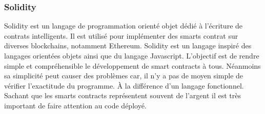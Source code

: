 \subsubsection{Solidity}

Solidity est un langage de programmation orienté objet dédié à l'écriture de contrats intelligents. Il est utilisé pour implémenter des smarts contrat sur diverses 
blockchains, notamment Ethereum. Solidity est un langage inspiré des langages orientées objets ainsi que du langage Javascript. L'objectif est de rendre simple et
compréhensible le développement de smart contracts à tous. Néanmoins sa simplicité peut causer des problèmes car, il n'y a pas de moyen simple de vérifier 
l'exactitude du programme. À la différence d'un langage fonctionnel. Sachant que les smarts contracts représentent souvent de l'argent il est très important
de faire attention au code déployé.
